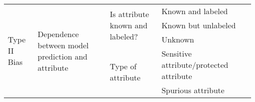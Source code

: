 \begin{table*}[htbp]
{\begin{tabular}{ll|llc}
                              \midrule
\multirow{5}{*}{Type II Bias} & \multirow{5}{*}{Dependence between model prediction and attribute} & \multirow{3}{*}{Is attribute known and labeled?} & Known and labeled                             & \cite{CSAD, Back_MI, learn_not_to_learn_Colored_MNIST}                                                     \\
                              &                                                                    &                                                  & Known but unlabeled                           & \cite{HEX_texture_bias1, ReBias_texture_bias2,rubi}                                                                \\
                              &                                                                    &                                                  & Unknown                                       & \cite{ECS,LfF_CelebA_Bias_conflicting,UBNet}                                                                                    \\
                             \cmidrule{3-5} 
                              &                                                                    & \multirow{2}{*}{Type of attribute}               & Sensitive attribute/protected attribute       & \cite{machine_bias,DP_FFVAE,LAFTR}                                                                         \\
                              &                                                                    &                                                  & Spurious attribute                            & \cite{Group_DRO,End, BCL}     \\
                              \bottomrule
\end{tabular}
}
   
\end{table*}







   


